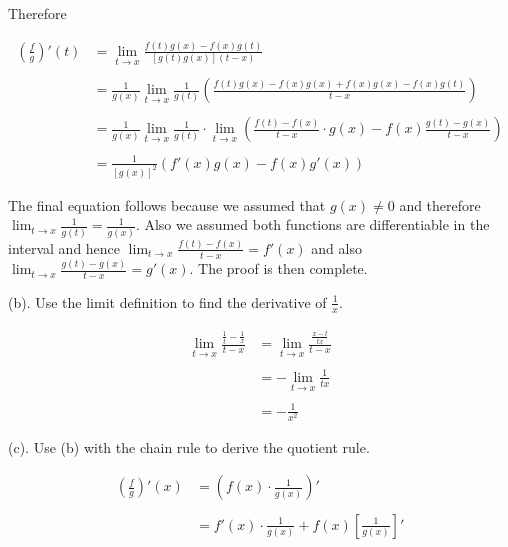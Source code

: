 \documentclass{article}
\begin{document}
  Therefore

  \begin{align*}
    \left(\frac f g\right)'(t) &= \lim_{t\to x}\frac{f(t)g(x)-f(x)g(t)}{[g(t)g(x)](t-x)} \\\\
    &= \frac{1}{g(x)}\lim_{t\to x}\frac{1}{g(t)}\left(\frac{f(t)g(x)-f(x)g(x)+f(x)g(x)-f(x)g(t)}{t-x}\right) \\\\
    &= \frac{1}{g(x)}\lim_{t\to x}\frac{1}{g(t)}\cdot \lim_{t\to x}\left(\frac{f(t)-f(x)}{t-x}\cdot g(x) - f(x)\frac{g(t)-g(x)}{t-x}\right) \\\\
    &= \frac{1}{[g(x)]^2}(f'(x)g(x)-f(x)g'(x))
  \end{align*}

  The final equation follows because we assumed that $g(x)\ne 0$ and therefore $\displaystyle\lim_{t\to x}\frac{1}{g(t)}=\frac{1}{g(x)}$.  Also we assumed both functions are differentiable in the interval and hence $\displaystyle\lim_{t\to x}\frac{f(t)-f(x)}{t-x}=f'(x)$ and also $\displaystyle\lim_{t\to x}\frac{g(t)-g(x)}{t-x}=g'(x)$.  The proof is then complete.

  \vspace{1cm}

  {\Large (b).  Use the limit definition to find the derivative of $\frac{1}{x}$.}

  \vspace{1cm}

  \begin{align*}
    \lim_{t\to x} \frac{\frac{1}{t}-\frac 1 x}{t-x} &= \lim_{t\to x}\frac{\frac{x-t}{tx}}{t-x}\\\\
    &= -\lim_{t\to x}\frac{1}{tx} \\\\
    &= -\frac{1}{x^2}
  \end{align*}

  \vspace{1cm}

  {\Large (c).  Use (b) with the chain rule to derive the quotient rule.}

  \vspace{1cm}

  \begin{align*}
    \left(\frac f g \right)'(x) &= \left(f(x)\cdot \frac{1}{g(x)}\right)' \\\\
    &= f'(x)\cdot \frac{1}{g(x)} + f(x)\left[\frac{1}{g(x)}\right]'
  \end{align*}
\end{document}
